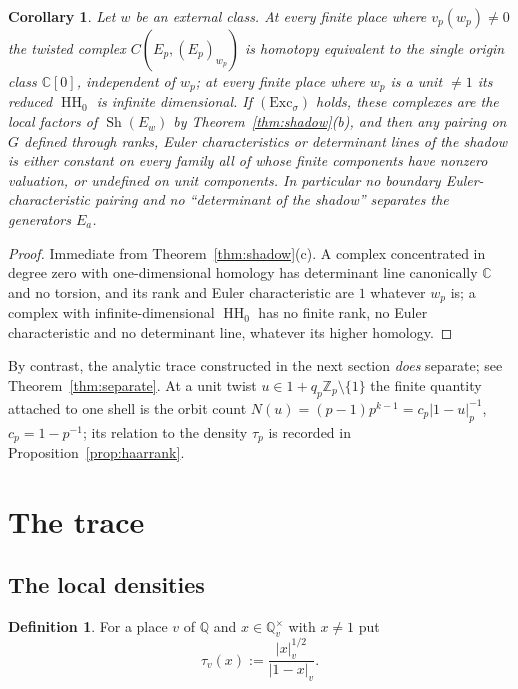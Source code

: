 \documentclass[11pt]{amsart}
\newtheorem{corollary}[theorem]{Corollary}
\theoremstyle{definition}
\newtheorem{definition}[theorem]{Definition}
\theoremstyle{remark}
\newcommand{\C}{\mathbb C}
\newcommand{\Z}{\mathbb Z}
\newcommand{\Q}{\mathbb Q}
\newcommand{\HH}{\operatorname{HH}}
\newcommand{\Sh}{\operatorname{Sh}}
\begin{document}
\begin{corollary}\label{cor:blind}
Let $w$ be an external class.  At every finite place where $v_p(w_p)\ne0$ the
twisted complex $C(E_p,(E_p)_{w_p})$ is homotopy equivalent to the single
origin class $\C[0]$, independent of $w_p$; at every finite place where $w_p$
is a unit $\ne1$ its reduced $\HH_0$ is infinite dimensional.  If
$(\mathrm{Exc}_{\sigma})$ holds, these complexes are the local factors of
$\Sh(E_w)$ by Theorem~\ref{thm:shadow}(b), and then any pairing on $G$ defined through ranks, Euler characteristics
or determinant lines of the shadow is either \emph{constant} on every family
all of whose finite components have nonzero valuation, or \emph{undefined} on
unit components.  In particular no boundary Euler-characteristic pairing and
no ``determinant of the shadow'' separates the generators $E_a$.
\end{corollary}

\begin{proof}
Immediate from Theorem~\ref{thm:shadow}(c).  A complex concentrated in degree
zero with one-dimensional homology has determinant line canonically $\C$ and
no torsion, and its rank and Euler characteristic are $1$ whatever $w_p$ is; a
complex with infinite-dimensional $\HH_0$ has no finite rank, no Euler
characteristic and no determinant line, whatever its higher homology.
\end{proof}

By contrast, the analytic trace constructed in the next section \emph{does}
separate; see Theorem~\ref{thm:separate}.  At a unit twist
$u\in1+q_p\Z_p\setminus\{1\}$ the finite quantity attached to one shell is the
orbit count $N(u)=(p-1)p^{k-1}=c_p|1-u|_p^{-1}$, $c_p=1-p^{-1}$; its relation to
the density $\tau_p$ is recorded in Proposition~\ref{prop:haarrank}.

\section{The trace}\label{sec:trace}

\subsection{The local densities}

\begin{definition}\label{def:tau}
For a place $v$ of $\Q$ and $x\in\Q_v^{\times}$ with $x\ne1$ put
\begin{equation}\label{eq:tau}
\tau_v(x):=\frac{|x|_v^{1/2}}{|1-x|_v}.
\end{equation}
\end{definition}
\end{document}

